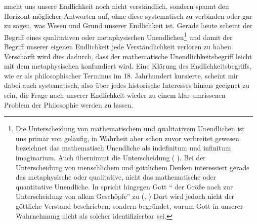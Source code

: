macht uns unsere Endlichkeit noch nicht verständlich, sondern spannt den
Horizont möglicher Antworten auf, ohne diese systematisch zu verbinden oder gar
zu sagen, was Wesen und Grund unserer Endlichkeit ist. Gerade heute scheint der
Begriff eines qualitativen oder metaphysischen Unendlichen\footnote{Die
Unterscheidung von mathematischem und qualitativem Unendlichen ist uns primär
von  geläufig, in Wahrheit aber schon zuvor
verbreitet gewesen.
\textcite[][\S~248]{Baumgarten:Metaphysica---Metaphysik2011} bezeichnet das
mathematisch Unendliche als indefinitum und infinitum imaginarium. Auch
 übernimmt die Unterscheidung
\mkbibparens{\cite[vgl.][]{Kant:DereinzigmoeglicheBeweisgrundvomDaseinGottes1977}
\cite[][II: 154.4--9]{Kant:GesammelteWerke1900ff.}}. Bei der Unterscheidung von
menschlichem und göttlichem Denken interessiert gerade das metaphysische oder
qualitative, nicht das mathematische oder quantitative Unendliche. In  spricht  hingegen Gott
\enquote{ der Größe nach zur Unterscheidung von allem Geschöpfe} zu
\mkbibparens{\cite[][A 322]{Kant:Washeisst:SichimDenkenorientieren?1977},
\cite[][VIII: 142.30]{Kant:GesammelteWerke1900ff.}} Dort wird jedoch nicht der
göttliche Verstand beschrieben, sondern begründet, warum Gott in unserer
Wahrnehmung nicht als solcher identifizierbar sei.} und damit der Begriff
unserer eigenen Endlichkeit jede Verständlichkeit verloren zu haben. Verschärft wird dies dadurch, dass der mathematische Unendlichkeitsbegriff leicht mit dem metaphysischen konfundiert wird. Eine Klärung des Endlichkeitsbegriffs, wie er
als philosophischer Terminus im 18. Jahrhundert kursierte, scheint mir dabei
auch systematisch, also über jedes historische Interesses hinaus geeignet zu
sein, die Frage nach unserer Endlichkeit wieder zu einem klar umrissenen Problem
der Philosophie werden zu lassen.

